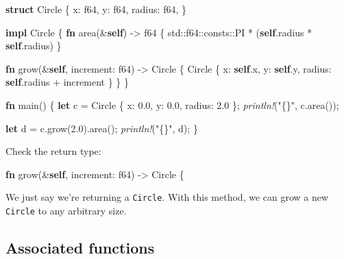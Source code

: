 \documentclass[a4paper,]{book}
\newenvironment{Shaded}{\begin{snugshade}}{\end{snugshade}}
\newcommand{\KeywordTok}[1]{\textcolor[rgb]{0.13,0.29,0.53}{\textbf{{#1}}}}
\newcommand{\DataTypeTok}[1]{\textcolor[rgb]{0.13,0.29,0.53}{{#1}}}
\newcommand{\DecValTok}[1]{\textcolor[rgb]{0.00,0.00,0.81}{{#1}}}
\newcommand{\StringTok}[1]{\textcolor[rgb]{0.31,0.60,0.02}{{#1}}}
\newcommand{\PreprocessorTok}[1]{\textcolor[rgb]{0.56,0.35,0.01}{\textit{{#1}}}}
\newcommand{\NormalTok}[1]{{#1}}
\begin{document}
\begin{Shaded}
\begin{Highlighting}[]
\KeywordTok{struct} \NormalTok{Circle \{}
    \NormalTok{x: }\DataTypeTok{f64}\NormalTok{,}
    \NormalTok{y: }\DataTypeTok{f64}\NormalTok{,}
    \NormalTok{radius: }\DataTypeTok{f64}\NormalTok{,}
\NormalTok{\}}

\KeywordTok{impl} \NormalTok{Circle \{}
    \KeywordTok{fn} \NormalTok{area(&}\KeywordTok{self}\NormalTok{) -> }\DataTypeTok{f64} \NormalTok{\{}
        \NormalTok{std::}\DataTypeTok{f64}\NormalTok{::consts::PI * (}\KeywordTok{self}\NormalTok{.radius * }\KeywordTok{self}\NormalTok{.radius)}
    \NormalTok{\}}

    \KeywordTok{fn} \NormalTok{grow(&}\KeywordTok{self}\NormalTok{, increment: }\DataTypeTok{f64}\NormalTok{) -> Circle \{}
        \NormalTok{Circle \{ x: }\KeywordTok{self}\NormalTok{.x, y: }\KeywordTok{self}\NormalTok{.y, radius: }\KeywordTok{self}\NormalTok{.radius + increment \}}
    \NormalTok{\}}
\NormalTok{\}}

\KeywordTok{fn} \NormalTok{main() \{}
    \KeywordTok{let} \NormalTok{c = Circle \{ x: }\DecValTok{0.0}\NormalTok{, y: }\DecValTok{0.0}\NormalTok{, radius: }\DecValTok{2.0} \NormalTok{\};}
    \PreprocessorTok{println!}\NormalTok{(}\StringTok{"\{\}"}\NormalTok{, c.area());}

    \KeywordTok{let} \NormalTok{d = c.grow(}\DecValTok{2.0}\NormalTok{).area();}
    \PreprocessorTok{println!}\NormalTok{(}\StringTok{"\{\}"}\NormalTok{, d);}
\NormalTok{\}}
\end{Highlighting}
\end{Shaded}

Check the return type:

\begin{Shaded}
\begin{Highlighting}[]
\KeywordTok{fn} \NormalTok{grow(&}\KeywordTok{self}\NormalTok{, increment: }\DataTypeTok{f64}\NormalTok{) -> Circle \{}
\end{Highlighting}
\end{Shaded}

We just say we're returning a \texttt{Circle}. With this method, we can
grow a new \texttt{Circle} to any arbitrary size.

\subsection{Associated functions}\label{associated-functions}
\end{document}
